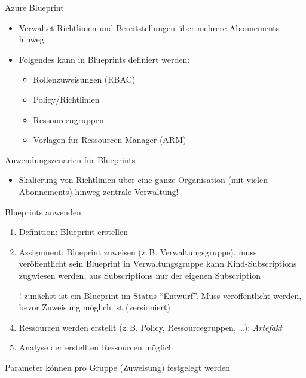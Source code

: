
\begin{flashcard}[Definition]{Azure Blueprint}
  \begin{itemize}
    \item Verwaltet Richtlinien und Bereitstellungen über mehrere Abonnements hinweg
    \item Folgendes kann in Blueprints definiert werden:
      \begin{itemize}
        \item Rollenzuweisungen (RBAC)
        \item Policy/Richtlinien
        \item Ressourcengruppen
        \item Vorlagen für Ressourcen-Manager (ARM)
      \end{itemize}
  \end{itemize}
\end{flashcard}

\begin{flashcard}[Definition]{Anwendungszenarien für Blueprints}
  \begin{itemize}
    \item Skalierung von Richtlinien über eine ganze Organisation (mit vielen Abonnements) hinweg\newline
      zentrale Verwaltung!
  \end{itemize}
\end{flashcard}

\begin{flashcard}[Definition]{Blueprints anwenden}
  \begin{enumerate}
    \item Definition: Blueprint erstellen
    \item Assignment: Blueprint zuweisen (z.\,B. Verwaltungsgruppe).\newline
      muss veröffentlicht sein
      Blueprint in Verwaltungsgruppe kann Kind-Subscriptions zugwiesen werden, aus Subscriptions nur der eigenen Subscription
    \item[!] zunächst ist ein Blueprint im Status ``Entwurf''. Muss veröffentlicht werden, bevor Zuweisung möglich ist (versioniert)
    \item Ressourcen werden erstellt (z.\,B. Policy, Ressourcegruppen, \ldots): \emph{Artefakt}
    \item Analyse der erstellten Ressourcen möglich
  \end{enumerate}
  Parameter können pro Gruppe (Zuweisung) festgelegt werden
\end{flashcard}

